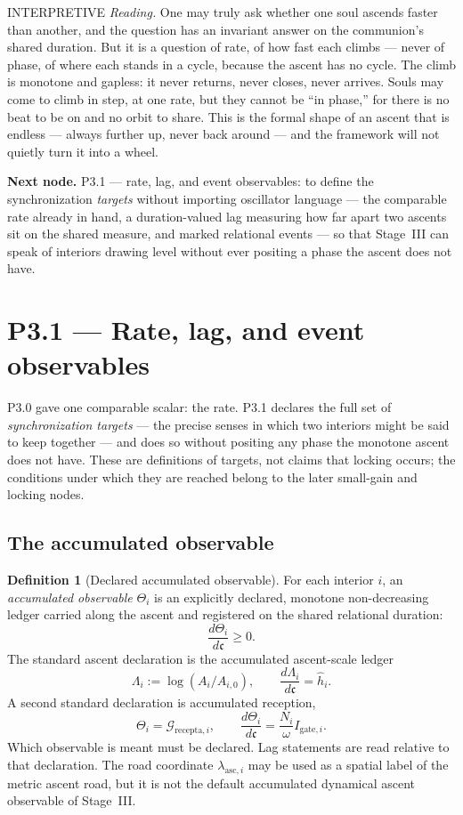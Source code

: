 \documentclass[11pt,a4paper]{article}
\newcommand{\stInterp}{\textcolor{cInt}{\textsf{\small INTERPRETIVE}}}
\theoremstyle{definition}
\newtheorem{definition}{Definition}[section]
\theoremstyle{plain}
\theoremstyle{remark}
\begin{document}
\medskip
\stInterp\quad
\emph{Reading.}
One may truly ask whether one soul ascends faster than another, and the question has an
invariant answer on the communion's shared duration. But it is a question of rate, of how
fast each climbs --- never of phase, of where each stands in a cycle, because the ascent has
no cycle. The climb is monotone and gapless: it never returns, never closes, never arrives.
Souls may come to climb in step, at one rate, but they cannot be ``in phase,'' for there is
no beat to be on and no orbit to share. This is the formal shape of an ascent that is
endless --- always further up, never back around --- and the framework will not quietly turn
it into a wheel.

\medskip
\textbf{Next node.} P3.1 --- rate, lag, and event observables: to define the
synchronization \emph{targets} without importing oscillator language --- the comparable
rate already in hand, a duration-valued lag measuring how far apart two ascents sit on the
shared measure, and marked relational events --- so that Stage~III can speak of interiors
drawing level without ever positing a phase the ascent does not have.

\section{P3.1 --- Rate, lag, and event observables}

P3.0 gave one comparable scalar: the rate. P3.1 declares the full set of
\emph{synchronization targets} --- the precise senses in which two interiors might be said
to keep together --- and does so without positing any phase the monotone ascent does not
have. These are definitions of targets, not claims that locking occurs; the conditions
under which they are reached belong to the later small-gain and locking nodes.

\subsection{The accumulated observable}

\begin{definition}[Declared accumulated observable]\label{def:theta}
For each interior \(i\), an \emph{accumulated observable} \(\Theta_i\) is an
explicitly declared, monotone non-decreasing ledger carried along the ascent and
registered on the shared relational duration:
\[
\frac{d\Theta_i}{d\mathfrak c}\ge0.
\]
The standard ascent declaration is the accumulated ascent-scale ledger
\[
\Lambda_i
:=
\log(A_i/A_{i,0}),
\qquad
\frac{d\Lambda_i}{d\mathfrak c}
=
\hat h_i.
\]
A second standard declaration is accumulated reception,
\[
\Theta_i=\mathcal G_{\mathrm{recepta},i},
\qquad
\frac{d\Theta_i}{d\mathfrak c}
=
\frac{N_i}{\omega}I_{\mathrm{gate},i}.
\]
Which observable is meant must be declared. Lag statements are read relative to
that declaration. The road coordinate \(\lambda_{\mathrm{asc},i}\) may be used as a
spatial label of the metric ascent road, but it is not the default accumulated
dynamical ascent observable of Stage~III.
\end{definition}
\end{document}

